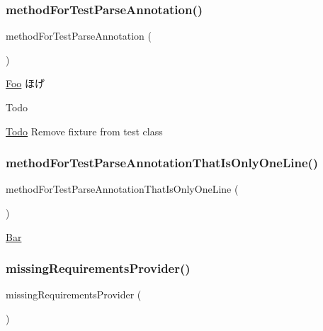 \subsubsection{\texorpdfstring{method\+For\+Test\+Parse\+Annotation()}{methodForTestParseAnnotation()}}
{\footnotesize\ttfamily method\+For\+Test\+Parse\+Annotation (\begin{DoxyParamCaption}{ }\end{DoxyParamCaption})}

\mbox{\hyperlink{class_foo}{Foo}}  ほげ

\begin{DoxyRefDesc}{Todo}
\item[\mbox{\hyperlink{todo__todo000021}{Todo}}]Remove fixture from test class \end{DoxyRefDesc}
\mbox{\label{class_util___test_test_a7771fb65b6afc32bd239dd5542c4ec98}} 
\subsubsection{\texorpdfstring{method\+For\+Test\+Parse\+Annotation\+That\+Is\+Only\+One\+Line()}{methodForTestParseAnnotationThatIsOnlyOneLine()}}
{\footnotesize\ttfamily method\+For\+Test\+Parse\+Annotation\+That\+Is\+Only\+One\+Line (\begin{DoxyParamCaption}{ }\end{DoxyParamCaption})}

\mbox{\hyperlink{class_bar}{Bar}} \mbox{\label{class_util___test_test_af842bf9c0e6248668d5c4775d8814db8}} 
\subsubsection{\texorpdfstring{missing\+Requirements\+Provider()}{missingRequirementsProvider()}}
{\footnotesize\ttfamily missing\+Requirements\+Provider (\begin{DoxyParamCaption}{ }\end{DoxyParamCaption})}

